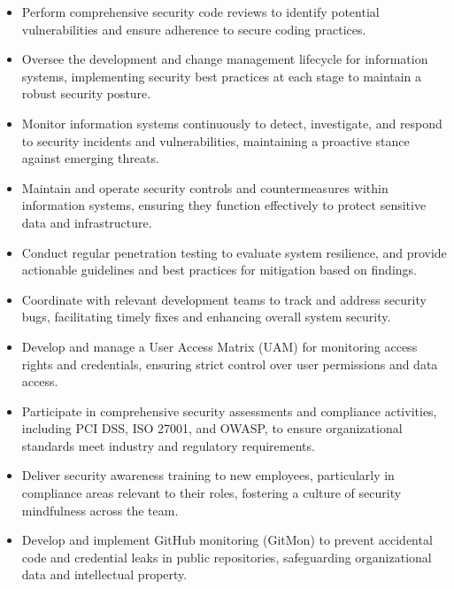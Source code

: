 \documentclass[10pt, letterpaper]{article}
\newenvironment{highlights}{
    \begin{itemize}[
        topsep=0.10 cm,
        parsep=0.10 cm,
        partopsep=0pt,
        itemsep=0pt,
        leftmargin=0 cm + 10pt
    ]
}{
    \end{itemize}
} %
\begin{document}
		\vspace{0.1 cm}
		\begin{justify}
			
			\begin{highlights}
			\item Perform comprehensive security code reviews to identify potential vulnerabilities and ensure adherence to secure coding practices.
			
			\item Oversee the development and change management lifecycle for information systems, implementing security best practices at each stage to maintain a robust security posture.
			
			\item Monitor information systems continuously to detect, investigate, and respond to security incidents and vulnerabilities, maintaining a proactive stance against emerging threats.
			
			\item Maintain and operate security controls and countermeasures within information systems, ensuring they function effectively to protect sensitive data and infrastructure.
			
			\item Conduct regular penetration testing to evaluate system resilience, and provide actionable guidelines and best practices for mitigation based on findings.
			
			\item Coordinate with relevant development teams to track and address security bugs, facilitating timely fixes and enhancing overall system security.
			
			\item Develop and manage a User Access Matrix (UAM) for monitoring access rights and credentials, ensuring strict control over user permissions and data access.
			
			\item Participate in comprehensive security assessments and compliance activities, including PCI DSS, ISO 27001, and OWASP, to ensure organizational standards meet industry and regulatory requirements.
			
			\item Deliver security awareness training to new employees, particularly in compliance areas relevant to their roles, fostering a culture of security mindfulness across the team.
			
			\item Develop and implement GitHub monitoring (GitMon) to prevent accidental code and credential leaks in public repositories, safeguarding organizational data and intellectual property.
				
				
				
			\end{highlights}
		\end{justify}
        \vspace{0.15 cm}
\end{document}
